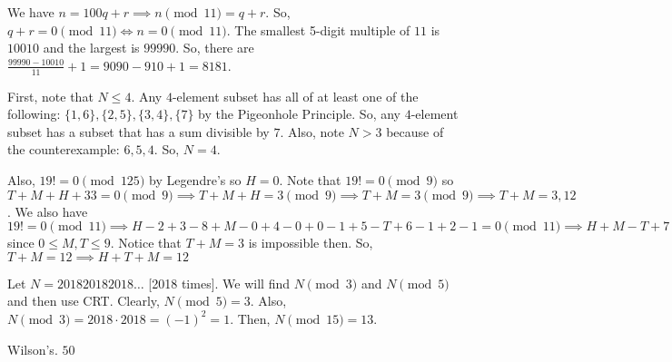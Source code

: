\documentclass[11pt]{article}
\begin{document}
\begin{sol}
We have $n=100q+r\implies n\pmod{11}=q+r$. So, $q+r=0\pmod{11}\iff n=0\pmod{11}$. The smallest 5-digit multiple of $11$ is $10010$ and the largest is $99990$. So, there are $\frac{99990-10010}{11}+1=9090-910+1=\boxed{8181}$.
\end{sol}


\begin{sol}
First, note that $N\leq 4$. Any $4$-element subset has all of at least one of the following: $\{1,6\},\{2,5\},\{3,4\},\{7\}$ by the Pigeonhole Principle. So, any $4$-element subset has a subset that has a sum divisible by $7$. Also, note $N>3$ because of the counterexample: $6,5,4$. So, $N=\boxed{4}$. 
\end{sol}


\begin{sol}
Also, $19!=0\pmod{125}$ by Legendre's so $H=0$. Note that $19!=0\pmod{9}$ so $T+M+H+33=0\pmod{9}\implies T+M+H=3\pmod{9}\implies T+M=3\pmod{9}\implies T+M=3,12$.  We also have $19!=0\pmod{11}\implies H-2+3-8+M-0+4-0+0-1+5-T+6-1+2-1=0\pmod{11}\implies H+M-T+7=0\pmod{11}\implies H+M-T=4\pmod{11}\implies M-T=4\pmod{11}\implies M-T=4$ since $0\leq M,T\leq 9$. Notice that $T+M=3$ is impossible then. So, $T+M=12\implies H+T+M=\boxed{12}$
\end{sol}


\begin{sol}
Let $N=201820182018\ldots$ [2018 times]. We will find $N\pmod{3}$ and $N\pmod{5}$ and then use CRT. Clearly, $N\pmod{5}=3$. Also, $N\pmod{3}=2018\cdot 2018=(-1)^2=1$. Then, $N\pmod{15}=\boxed{13}$.
\end{sol}


\begin{sol}
Wilson's. $\boxed{50}$
\end{sol}
\end{document}
